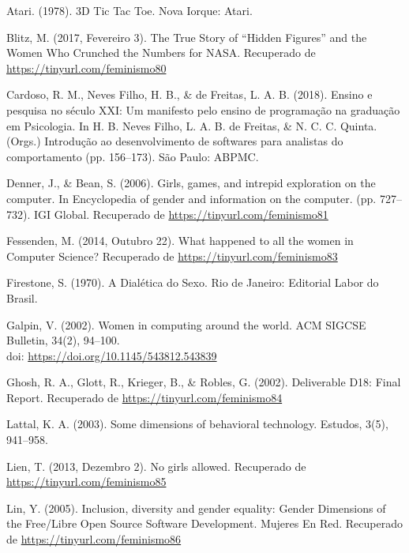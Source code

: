 \hangindent=25pt
\noindent Atari. (1978). 3D Tic Tac Toe. Nova Iorque: Atari.

\hangindent=25pt
\noindent Blitz, M. (2017, Fevereiro 3). The True Story of “Hidden Figures” and the Women Who Crunched the Numbers for NASA. Recuperado de \url{https://tinyurl.com/feminismo80}

\hangindent=25pt
\noindent Cardoso, R. M., Neves Filho, H. B., \& de Freitas, L. A. B. (2018). Ensino e pesquisa no século XXI: Um manifesto pelo ensino de programação na graduação em Psicologia. In H. B. Neves Filho, L. A. B. de Freitas, \& N. C. C. Quinta. (Orgs.) Introdução ao desenvolvimento de softwares para analistas do comportamento (pp. 156–173). São Paulo: ABPMC.

\hangindent=25pt
\noindent Denner, J., \& Bean, S. (2006). Girls, games, and intrepid exploration on the computer. In Encyclopedia of gender and information on the computer. (pp. 727–732). IGI Global. Recuperado de \url{https://tinyurl.com/feminismo81}

\hangindent=25pt
\noindent Fessenden, M. (2014, Outubro 22). What happened to all the women in Computer Science? Recuperado de \url{https://tinyurl.com/feminismo83}

\hangindent=25pt
\noindent Firestone, S. (1970). A Dialética do Sexo. Rio de Janeiro: Editorial Labor do Brasil.

\hangindent=25pt
\noindent Galpin, V. (2002). Women in computing around the world. ACM SIGCSE Bulletin, 34(2), 94–100.\\doi: \url{https://doi.org/10.1145/543812.543839}

\hangindent=25pt
\noindent Ghosh, R. A., Glott, R., Krieger, B., \& Robles, G. (2002). Deliverable D18: Final Report. Recuperado de \url{https://tinyurl.com/feminismo84}

\hangindent=25pt
\noindent Lattal, K. A. (2003). Some dimensions of behavioral technology. Estudos, 3(5), 941–958.

\hangindent=25pt
\noindent Lien, T. (2013, Dezembro 2). No girls allowed. Recuperado de \url{https://tinyurl.com/feminismo85}

\hangindent=25pt
\noindent Lin, Y. (2005). Inclusion, diversity and gender equality: Gender Dimensions of the Free/Libre Open Source Software Development. Mujeres En Red. Recuperado de \url{https://tinyurl.com/feminismo86}

